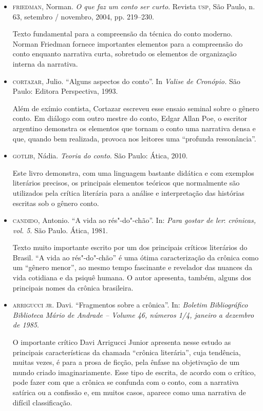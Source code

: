 \documentclass[11pt]{extarticle}
\begin{document}
\begin{itemize}
\item \textsc{friedman}, Norman. \emph{O que faz um conto ser curto}. Revista \textsc{usp}, São
Paulo, n. 63, setembro / novembro, 2004, pp. 219--230. 

Texto
fundamental para a compreensão da técnica do conto moderno. Norman
Friedman fornece importantes elementos para a compreensão do conto
enquanto narrativa curta, sobretudo os elementos de organização interna
da narrativa.

\item \textsc{cortazar}, Julio. ``Alguns aspectos do conto''. In \emph{Valise de
Cronópio.} São Paulo: Editora Perspectiva, 1993. 

Além de exímio
contista, Cortazar escreveu esse ensaio seminal sobre o gênero conto. Em
diálogo com outro mestre do conto, Edgar Allan Poe, o escritor argentino
demonstra os elementos que tornam o conto uma narrativa densa e que,
quando bem realizada, provoca nos leitores uma ``profunda ressonância''.

\item \textsc{gotlib}, Nádia. \emph{Teoria do conto}. São Paulo: Ática, 2010. 

Este
livro demonstra, com uma linguagem bastante didática e com exemplos
literários precisos, os principais elementos teóricos que normalmente
são utilizados pela crítica literária para a análise e interpretação das
histórias escritas sob o gênero conto.

\item \textsc{candido}, Antonio. ``A vida ao rés"-do"-chão''. In: \emph{Para gostar de
ler}: \emph{crônicas, vol. 5}. São Paulo. Ática, 1981. 

Texto muito
importante escrito por um dos principais críticos literários do Brasil.
``A vida ao rés"-do"-chão'' é uma ótima caracterização da crônica como um
``gênero menor'', ao mesmo tempo fascinante e revelador das nuances da
vida cotidiana e da psiquê humana. O autor apresenta, também, alguns dos
principais nomes da crônica brasileira.

\item \textsc{arrigucci jr}. Davi. ``Fragmentos sobre a crônica''. In: \emph{Boletim
Bibliográfico Biblioteca Mário de Andrade -- Volume 46, números 1/4,
janeiro a dezembro de 1985}. 

O importante crítico Davi Arrigucci Junior
apresenta nesse estudo as principais características da chamada
``crônica literária'', cuja tendência, muitas vezes, é para a prosa de
ficção, pela ênfase na objetivação de um mundo criado imaginariamente.
Esse tipo de escrita, de acordo com o crítico, pode fazer com que a
crônica se confunda com o conto, com a narrativa satírica ou a confissão
e, em muitos casos, aparece como uma narrativa de difícil classificação.


\end{itemize}
\end{document}
